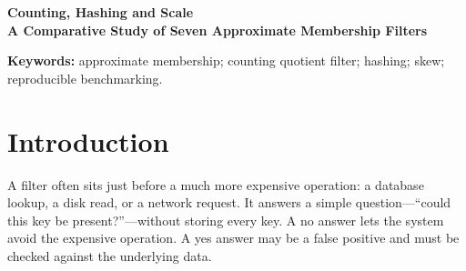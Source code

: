 \begin{center}
{\Large\bfseries\color{ink} Counting, Hashing and Scale}\\[3pt]
{\large\bfseries A Comparative Study of Seven Approximate Membership Filters}
\end{center}
\vspace{-5pt}
\begin{abstract}
Approximate membership filters save space by allowing a small probability of answering yes for an absent key. Choosing one becomes harder when the application also needs deletions, repeated-key counts, or a filter that remains practical beyond small workloads. We extend our earlier three-filter study in three directions: a 67-million-operation comparison, a controlled evaluation of three CQF hashing paths, and a common benchmark for seven filter families. The expanded suite includes Counting Quotient, Cuckoo, Bloom, Counting Bloom, Blocked Bloom, XOR and a scalar Binary Fuse-style filter. We separate online updates from immutable construction, verify workload cardinality and query disjointness exactly, and retain raw repetitions and configuration records. The results show that capacity rounding, duplicate semantics and hash choice can materially change the apparent ranking. At 67M uniform operations, \UniformFastestQuery{} has the highest measured positive-query throughput in our implementation set; the ordinary Cuckoo filter accepts only 24 operations on the duplicate-heavy stream. A separately sized CQF completes the full skewed stream and its deletions in \CompactMemory{}\,MB, compared with \PrimaryCqfMemory{}\,MB under the conservative primary sizing rule. Hash changes offer operation-specific gains at identical CQF memory, rather than one universally faster mode. All new measurements use an x86-64 Linux container translated on Apple M2, so they support comparisons within this setup and qualified comparisons with the earlier report and the SIGMOD reference results.
\end{abstract}
\noindent\textbf{Keywords:} approximate membership; counting quotient filter; hashing; skew; reproducible benchmarking.

\section{Introduction}
A filter often sits just before a much more expensive operation: a database lookup, a disk read, or a network request. It answers a simple question---``could this key be present?''---without storing every key. A no answer lets the system avoid the expensive operation. A yes answer may be a false positive and must be checked against the underlying data.

